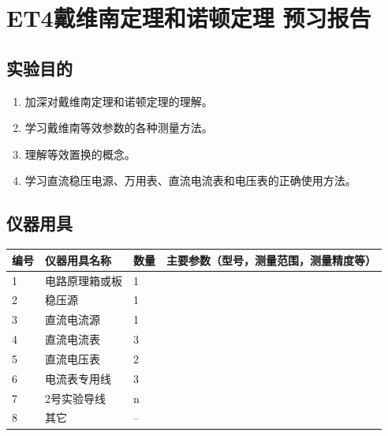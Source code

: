 \documentclass[dvipsnames, svgnames,a4paper,11pt]{article}
\begin{document}
	\clearpage
	\tableofcontents
	\clearpage
	
	
	
	
	\setcounter{section}{0}
\section{ET4戴维南定理和诺顿定理 \quad\heiti 预习报告}
	
	\subsection{实验目的}
	\begin{enumerate}
		\item 加深对戴维南定理和诺顿定理的理解。
	\item 学习戴维南等效参数的各种测量方法。
	\item 理解等效置换的概念。
	\item 学习直流稳压电源、万用表、直流电流表和电压表的正确使用方法。
	\end{enumerate}
	
	\subsection{仪器用具}
	\begin{table}[htbp]
		\centering
		\renewcommand\arraystretch{1.6}
		\begin{tabular}{|p{}|p{}|p{}|p{}|}
			\hline
			编号& 仪器用具名称 & 数量 &  主要参数（型号，测量范围，测量精度等） \\
			\hline
			1& 电路原理箱或板 & 1 &  \\
			\hline
			2& 稳压源 & 1 &  \\
			\hline
			3& 直流电流源 & 1 &  \\
			\hline
			4& 直流电流表 & 3 &  \\
			\hline
			5& 直流电压表 & 2 &  \\
			\hline
			6& 电流表专用线 & 3 &  \\
			\hline
			7& 2号实验导线 & n &  \\
			\hline
			8& 其它 & -- &  \\
			\hline
		\end{tabular}
	\end{table}
	
\end{document}
